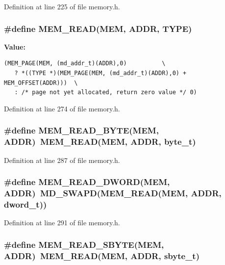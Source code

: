 Definition at line 225 of file memory.h.
\subsubsection[{MEM\_\-READ}]{\setlength{\rightskip}{0pt plus 5cm}\#define MEM\_\-READ(MEM, \/  ADDR, \/  TYPE)}\label{memory_8h_ade0bb90ecee3019c4ed93501d7d3603}


\textbf{Value:}

\begin{Code}\begin{verbatim}(MEM_PAGE(MEM, (md_addr_t)(ADDR),0)          \
   ? *((TYPE *)(MEM_PAGE(MEM, (md_addr_t)(ADDR),0) + MEM_OFFSET(ADDR)))  \
   : /* page not yet allocated, return zero value */ 0)
\end{verbatim}
\end{Code}


Definition at line 274 of file memory.h.
\subsubsection[{MEM\_\-READ\_\-BYTE}]{\setlength{\rightskip}{0pt plus 5cm}\#define MEM\_\-READ\_\-BYTE(MEM, \/  ADDR)~MEM\_\-READ(MEM, ADDR, {\bf byte\_\-t})}\label{memory_8h_85d685b6654896c2141a548a2d891f1e}




Definition at line 287 of file memory.h.
\subsubsection[{MEM\_\-READ\_\-DWORD}]{\setlength{\rightskip}{0pt plus 5cm}\#define MEM\_\-READ\_\-DWORD(MEM, \/  ADDR)~MD\_\-SWAPD(MEM\_\-READ(MEM, ADDR, {\bf dword\_\-t}))}\label{memory_8h_5c05e229b73207dac15220b595774e64}




Definition at line 291 of file memory.h.
\subsubsection[{MEM\_\-READ\_\-SBYTE}]{\setlength{\rightskip}{0pt plus 5cm}\#define MEM\_\-READ\_\-SBYTE(MEM, \/  ADDR)~MEM\_\-READ(MEM, ADDR, {\bf sbyte\_\-t})}\label{memory_8h_c766bf126503da78f89f84b336b45235}




